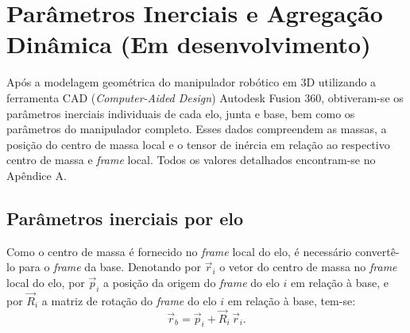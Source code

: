 


\section{Parâmetros Inerciais e Agregação Dinâmica (Em desenvolvimento)}
Após a modelagem geométrica do manipulador robótico em 3D utilizando a ferramenta CAD (\emph{Computer-Aided Design}) Autodesk Fusion 360, obtiveram-se os parâmetros inerciais individuais de cada elo, junta e base, bem como os parâmetros do manipulador completo. Esses dados compreendem as massas, a posição do centro de massa local e o tensor de inércia em relação ao respectivo centro de massa e \emph{frame} local. Todos os valores detalhados encontram-se no Apêndice A.

\subsection{Parâmetros inerciais por elo}
Como o centro de massa é fornecido no \emph{frame} local do elo, é necessário convertê-lo para o \emph{frame} da base. Denotando por $\vec{r}_{i}$ o vetor do centro de massa no \emph{frame} local do elo, por $\vec{p}_i$ a posição da origem do \emph{frame} do elo $i$ em relação à base, e por $\vec{R}_i$ a matriz de rotação do \emph{frame} do elo $i$ em relação à base, tem-se:
\begin{equation}
    \vec r_b = \vec p_i + \vec R_i \, \vec r_{i}.
\end{equation}

